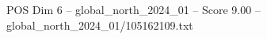 \begin{textsample}{POS Dim 6 – global\_north\_2024\_01 – Score 9.00 – global\_north\_2024\_01/105162109.txt}
\end{textsample}

